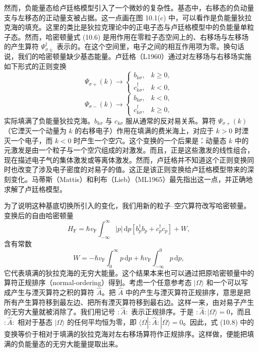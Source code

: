 然而，负能量态给卢廷格模型引入了一个微妙的复杂性。基态中，右移态的负动量支与左移态的正动量支被占据。这一点画在图 10.1(c) 中，可以看作是负能量狄拉克海的填充。这里的类比是狄拉克理论中的正电子态与卢廷格模型中的负能量单粒子态。然而，哈密顿量式 (10.6) 是用作用在零粒子态空间上的、右移场与左移场的产生算符 $\Psi_{\sigma\pm}^{\dagger}$ 表示的。在这个空间里，电子之间的相互作用项为零。换句话说，我们的哈密顿量缺少基态能量。卢廷格（L1960）通过对左移场与右移场实施如下形式的正则变换
\begin{equation*}
\Psi_{\sigma+}(k)\to
\begin{cases}
b_{k\sigma}, & k\geqslant 0,\\
c_{k\sigma}^{\dagger}, & k<0,
\end{cases}
\tag{10.8}
\end{equation*}
\begin{equation*}
\Psi_{\sigma-}(k)\to
\begin{cases}
b_{k\sigma}, & k<0,\\
c_{k\sigma}^{\dagger}, & k\geqslant 0,
\end{cases}
\tag{10.9}
\end{equation*}
实际填满了负能量狄拉克海。$b_{k\sigma}$ 与 $c_{k\sigma}$ 服从通常的反对易关系。算符 $\Psi_{\sigma+}(k)$（它湮灭一个动量为 $k$ 的右移电子）作用在填满的费米海上，对应于 $k>0$ 时湮灭一个电子，而 $k<0$ 时产生一个空穴。这个变换的一个后果是：动量态 $k$ 中的元激发是由一个粒子与一个空穴组成的对激发。而且，正是这些激发的线性组合，现在描述电子气的集体激发或等离体激发。然而，卢廷格并不知道这个正则变换同时也改变了涉及电子密度的对易子的值。这正是该正则变换给卢廷格模型带来的深刻变化。马蒂斯（Mattis）和利布（Lieb）（ML1965）最先指出这一点，并正确地求解了卢廷格模型。

为了说明这种基底切换所引入的变化，我们用新的粒子–空穴算符改写哈密顿量。变换后的自由哈密顿量
\begin{equation*}
H_{\mathrm{F}}=\hbar v_{\mathrm{F}}\int_{-\infty}^{\infty}|p|\,\mathrm{d}p\left[b_{p}^{\dagger}b_{p}+c_{p}^{\dagger}c_{p}\right]+W,
\tag{10.10}
\end{equation*}
含有常数
\begin{equation*}
W=-\hbar v_{\mathrm{F}}\int_{0}^{\infty}p\,\mathrm{d}p+\hbar v_{\mathrm{F}}\int_{-\infty}^{0}p\,\mathrm{d}p,
\tag{10.11}
\end{equation*}
它代表填满的狄拉克海的无穷大能量。这个结果本来也可以通过把原哈密顿量中的算符正规排序（normal-ordering）得到。考虑一个任意参考态 $|\Omega\rangle$ 和一个可以写成产生与湮灭算符之积的算符 $\hat{A}$。把 $\hat{A}$ 中的产生与湮灭算符正规排序，意思是把所有产生算符移到最左边、把所有湮灭算符移到最右边。这样一来，由对易子产生的无穷大量就被消除了。我们用记号 $:\hat{A}:$ 表示正规排序。于是 $:\hat{A}:|\Omega\rangle=0$，而且 $:\hat{A}:$ 相对于基态 $|\Omega\rangle$ 的任何平均恒为零，即 $\langle\Omega|:\hat{A}:|\Omega\rangle=0$。因此，式 (10.8) 中的变换等价于相对于填满的狄拉克海对左右移场算符作正规排序。这样做，便能把填满的负能量态的无穷大能量提取出来。

